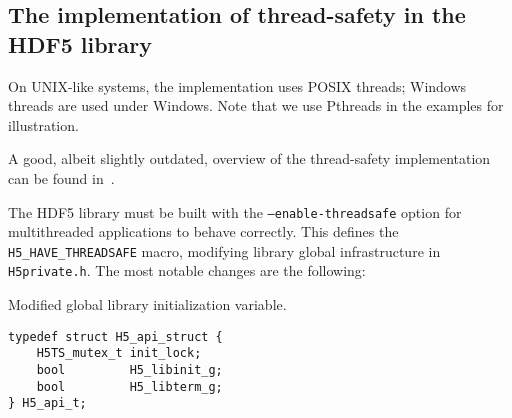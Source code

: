 \subsection{The implementation of thread-safety in the HDF5 library}\label{sec:H5TS-impl}

On UNIX-like systems, the implementation uses POSIX threads; Windows threads are used under Windows. Note that we use Pthreads in the examples for illustration.

A good, albeit slightly outdated, overview of the thread-safety implementation can be found in~\cite{libhdf5-ts}.

The HDF5 library must be built with the \texttt{--enable-threadsafe} option for multithreaded applications to behave correctly. 
This defines the \texttt{H5\_HAVE\_THREADSAFE} macro, modifying library global infrastructure in \texttt{H5private.h}. The most notable changes are the following:

\begin{listing}
\centering
\caption{Modified global library initialization variable.}
\label{lst:pthreads-init}
\begin{verbatim}
typedef struct H5_api_struct {
    H5TS_mutex_t init_lock;
    bool         H5_libinit_g;
    bool         H5_libterm_g;
} H5_api_t;
\end{verbatim}
\end{listing}

